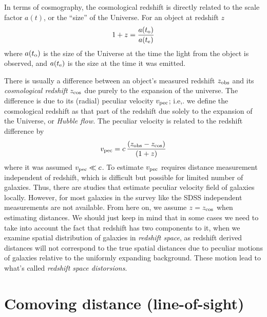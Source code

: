 In terms of cosmography, the cosmological redshift is directly related
to the scale factor $a(t)$, or the ``size'' of the Universe.  For an
object at redshift $z$
\begin{equation}
1+z = \frac{a(t_{\rm o})}{a(t_{\rm e})}
\end{equation}
where $a(t_{\rm o})$ is the size of the Universe at the time the light
from the object is observed, and $a(t_{\rm e})$ is the size at the
time it was emitted.

There is usually a difference between an object's measured redshift $z_{\rm obs}$ and
its {\it cosmological redshift\/} $z_{\rm cos}$ due purely to the expansion of the universe. 
The difference is due to its (radial) {peculiar velocity\/} $v_{\rm pec}$; i.e,. we define the
cosmological redshift as that part of the redshift due solely to the
expansion of the Universe, or {\it Hubble flow.} The peculiar
velocity is related to the redshift difference by
\begin{equation}
v_{\rm pec} = c\,\frac{(z_{\rm obs}-z_{\rm cos})}{(1+z)}
\end{equation}
where it was assumed $v_{\rm pec}\ll c$. To estimate $v_{\rm pec}$ requires distance measurement independent of redshift, which is difficult but possible for limited number of galaxies. Thus, there are studies that estimate peculiar velocity field of galaxies locally. However, for most galaxies in the survey like the SDSS independent measurements are not available. From here on, we
assume $z=z_{\rm cos}$ when estimating distances. We should just keep in mind that in some cases we need to take into account the fact that redshift has two components to it, when we examine spatial distribution of galaxies in {\it redshift space}, as redshift derived distances will not correspond to the true spatial distances due to peculiar motions of galaxies relative to the uniformly expanding background. These motion lead to what's called {\it redshift space distorsions}. 

\section{Comoving distance (line-of-sight)}

